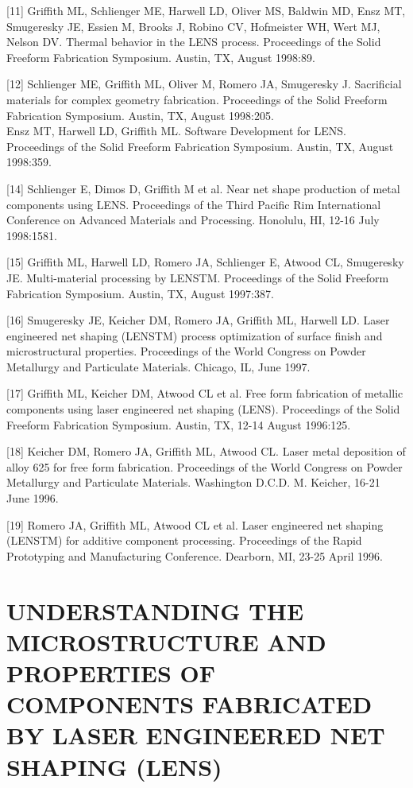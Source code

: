 \documentclass[10pt]{article}
\begin{document}
[11] Griffith ML, Schlienger ME, Harwell LD, Oliver MS, Baldwin MD, Ensz MT, Smugeresky JE, Essien M, Brooks J, Robino CV, Hofmeister WH, Wert MJ, Nelson DV. Thermal behavior in the LENS process. Proceedings of the Solid Freeform Fabrication Symposium. Austin, TX, August 1998:89.

[12] Schlienger ME, Griffith ML, Oliver M, Romero JA, Smugeresky J. Sacrificial materials for complex geometry fabrication. Proceedings of the Solid Freeform Fabrication Symposium. Austin, TX, August 1998:205.\\
[13] Ensz MT, Harwell LD, Griffith ML. Software Development for LENS. Proceedings of the Solid Freeform Fabrication Symposium. Austin, TX, August 1998:359.

[14] Schlienger E, Dimos D, Griffith M et al. Near net shape production of metal components using LENS. Proceedings of the Third Pacific Rim International Conference on Advanced Materials and Processing. Honolulu, HI, 12-16 July 1998:1581.

[15] Griffith ML, Harwell LD, Romero JA, Schlienger E, Atwood CL, Smugeresky JE. Multi-material processing by LENSTM. Proceedings of the Solid Freeform Fabrication Symposium. Austin, TX, August 1997:387.

[16] Smugeresky JE, Keicher DM, Romero JA, Griffith ML, Harwell LD. Laser engineered net shaping (LENSTM) process optimization of surface finish and microstructural properties. Proceedings of the World Congress on Powder Metallurgy and Particulate Materials. Chicago, IL, June 1997.

[17] Griffith ML, Keicher DM, Atwood CL et al. Free form fabrication of metallic components using laser engineered net shaping (LENS). Proceedings of the Solid Freeform Fabrication Symposium. Austin, TX, 12-14 August 1996:125.

[18] Keicher DM, Romero JA, Griffith ML, Atwood CL. Laser metal deposition of alloy 625 for free form fabrication. Proceedings of the World Congress on Powder Metallurgy and Particulate Materials. Washington D.C.D. M. Keicher, 16-21 June 1996.

[19] Romero JA, Griffith ML, Atwood CL et al. Laser engineered net shaping (LENSTM) for additive component processing. Proceedings of the Rapid Prototyping and Manufacturing Conference. Dearborn, MI, 23-25 April 1996.

\section*{UNDERSTANDING THE MICROSTRUCTURE AND PROPERTIES OF COMPONENTS FABRICATED BY LASER ENGINEERED NET SHAPING (LENS) }
\end{document}
